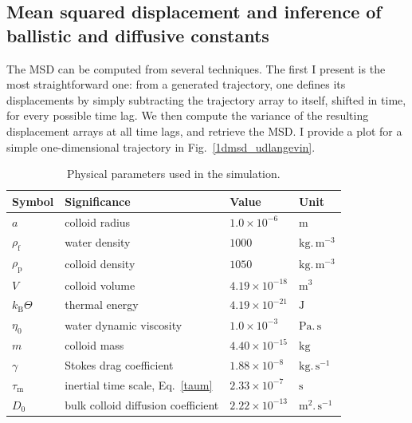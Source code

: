 \subsection{Mean squared displacement and inference of ballistic and diffusive constants}
The MSD can be computed from several techniques. The first I present is the most straightforward one: from a generated trajectory, one defines its displacements by simply subtracting the trajectory array to itself, shifted in time, for every possible time lag. We then compute the variance of the resulting displacement arrays at all time lags, and retrieve the MSD. I provide a plot for a simple one-dimensional trajectory in Fig.~\ref{1dmsd_udlangevin}.
\begin{table}[htbp]
\centering
\caption{Physical parameters used in the simulation.}
\label{tab:simulation_parameters}
\begin{tabular}{llll}
\hline
Symbol & Significance & Value & Unit \\
\hline
$a$ & colloid radius & $1.0 \times 10^{-6}$ & $\mathrm{m}$ \\
$\rho_\mathrm{f}$ & water density & $1000$ & $\mathrm{kg.\,m^{-3}}$ \\
$\rho_\mathrm{p}$ & colloid density & $1050$ & $\mathrm{kg.\,m^{-3}}$ \\
$V$ & colloid volume & $4.19 \times 10^{-18}$ & $\mathrm{m^3}$ \\
$k_\mathrm{B}\Theta$ & thermal energy & $4.19 \times 10^{-21}$ & $\mathrm{J}$ \\
$\eta_0$ & water dynamic viscosity & $1.0 \times 10^{-3}$ & $\mathrm{Pa.\,s}$ \\
$m$ & colloid mass & $4.40 \times 10^{-15}$ & $\mathrm{kg}$ \\
$\gamma$ & Stokes drag coefficient & $1.88 \times 10^{-8}$ & $\mathrm{kg.\,s^{-1}}$ \\
$\tau_\mathrm{m}$ & inertial time scale, Eq.~\ref{taum} & $2.33 \times 10^{-7}$ & $\mathrm{s}$ \\
$D_0$ & bulk colloid diffusion coefficient & $2.22 \times 10^{-13}$ & $\mathrm{m^2.\,s^{-1}}$ \\
\hline
\end{tabular}
\end{table}
